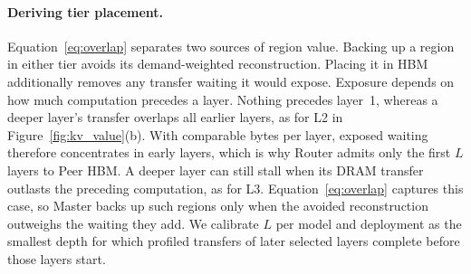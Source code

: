 \paragraph{Deriving tier placement.}
Equation~\ref{eq:overlap} separates two sources of region value. Backing
up a region in either tier avoids its demand-weighted reconstruction.
Placing it in HBM additionally removes any transfer waiting it would
expose. Exposure depends on how much computation precedes a layer.
Nothing precedes layer~1, whereas a deeper layer's transfer overlaps all
earlier layers, as for L2 in Figure~\ref{fig:kv_value}(b). With comparable
bytes per layer, exposed waiting therefore concentrates in early layers,
which is why Router admits only the first $L$ layers to Peer HBM. A deeper
layer can still stall when its DRAM transfer outlasts the preceding
computation, as for L3. Equation~\ref{eq:overlap} captures this case, so
Master backs up such regions only when the avoided reconstruction
outweighs the waiting they add. We calibrate $L$ per model and
deployment as the smallest depth for which profiled transfers of later
selected layers complete before those layers start.

